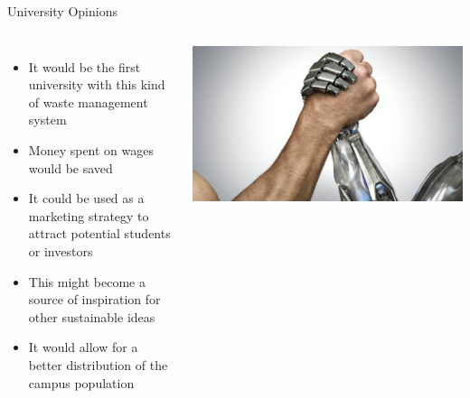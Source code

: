 \documentclass[18pt]{beamer}
\begin{document}
    \begin{frame}{University Opinions}
        \begin{columns}
            \begin{itemize}
                \item It would be the first university with this kind of waste management system \pause
                \item Money spent on wages would be saved \pause
                \item It could be used as a marketing strategy to attract potential students or investors \pause
                \item This might become a source of inspiration for other sustainable \pause ideas \pause
                \item It would allow for a better distribution of the campus population
            \end{itemize}
            \includegraphics[width=0.99\columnwidth]{humanvsrobot}
        \end{columns}
    \end{frame}
\end{document}
